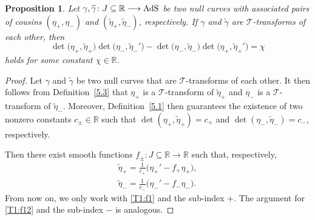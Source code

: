 \documentclass[10pt,a4paper]{amsart}
\numberwithin{equation}{section}
\newtheorem{Proposition}[Theorem]{Proposition}
 { \theoremstyle{definition}
\newtheorem{Definition}[Theorem]{Definition}
\newtheorem{Note}[Theorem]{Note}
\newtheorem{Example}[Theorem]{Example}
\newtheorem{Remark}[Theorem]{Remark} }
\def\R{\mathbb{R}}
\def\AdS{{\rm AdS}}
\begin{document}
\begin{Proposition}\label{T1} Let $\gamma,\widetilde{\gamma}\colon J\subseteq\R\longrightarrow\AdS$ be two null curves with associated pairs of cousins $(\eta_+,\eta_-)$ and $(\widetilde{\eta}_+,\widetilde{\eta}_-)$, respectively. If $\gamma$ and $\widetilde{\gamma}$ are $\mathcal{T}$-transforms of each other, then
	\begin{equation}\label{chi}
		\det \bigl(\eta_+,\widetilde{\eta}_+\bigr)\det \bigl(\eta_-,\widetilde{\eta}_-'\bigr)-\det \bigl(\eta_-,\widetilde{\eta}_-\bigr)\det \bigl(\eta_+,\widetilde{\eta}_+'\bigr)=\chi
	\end{equation}
	holds for some constant $\chi\in\R$.
\end{Proposition}
\begin{proof} Let $\gamma$ and $\widetilde{\gamma}$ be two null curves that are $\mathcal{T}$-transforms of each other. It then follows from Definition~\ref{5.3} that $\eta_+$ is a $\mathcal{T}$-transform of $\widetilde{\eta}_+$ and $\eta_-$ is a $\mathcal{T}$-transform of $\widetilde{\eta}_-$. Moreover, Defi\-ni\-tion~\ref{5.1} then guarantees the existence of two nonzero constants $c_\pm\in\R$ such that ${\det (\eta_+,\widetilde{\eta}_+)=c_+}$ and $\det (\eta_-,\widetilde{\eta}_-)=c_-$, respectively.
	
	Then there exist smooth functions $f_{\pm}\colon J\subseteq\R\longrightarrow \R$ such that, respectively,
	\begin{gather}
		\widetilde{\eta}_+=\frac{1}{c_+}\bigl(\eta_+'-f_+\eta_+\bigr),\label{T1:f1}\\
		\widetilde{\eta}_-=\frac{1}{c_-}\bigl(\eta_-'-f_-\eta_-\bigr).\label{T1:f12}
	\end{gather}
	From now on, we only work with \eqref{T1:f1} and the sub-index $+$. The argument for \eqref{T1:f12} and the sub-index $-$ is analogous.
	

\end{proof}
\end{document}
